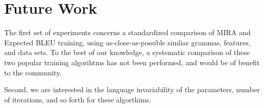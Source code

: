 \section{Future Work}
The first set of experiments concerns a standardized comparison of MIRA and Expected BLEU training, using as-close-as-possible simliar grammas, features, and data sets. To the best of our knowledge, a systematic comparison of these two popular training algorihtms has not been performed, and would be of benefit to the community. 

Second, we are interested in the language invariability of the parameters, number of iterations, and so forth for these algorthims. 


